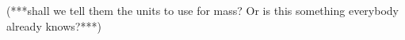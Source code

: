 \Large
(***shall
we tell them the units to use for mass?  Or is this something everybody
already knows?***)
\normalsize


% 
% 
% 

